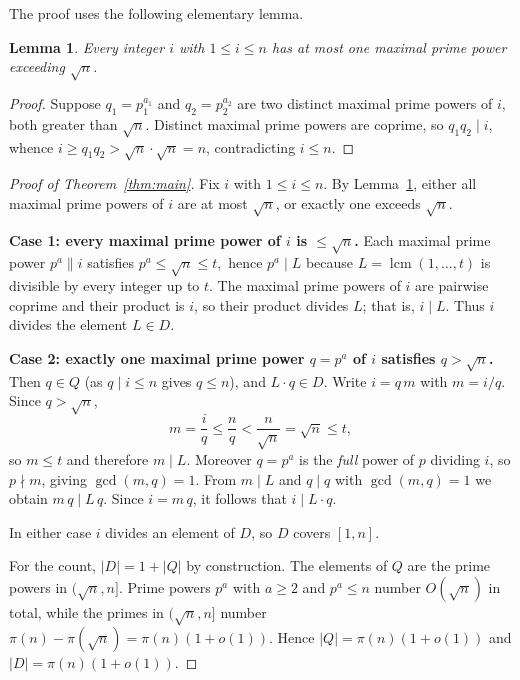 \documentclass[11pt]{article}
\newtheorem{lemma}{Lemma}
\theoremstyle{definition}
\theoremstyle{remark}
\DeclareMathOperator{\lcm}{lcm}
\begin{document}
The proof uses the following elementary lemma.

\begin{lemma}\label{lem:atmostone}
Every integer $i$ with $1\le i\le n$ has at most one maximal prime power
exceeding $\sqrt n$.
\end{lemma}

\begin{proof}
Suppose $q_1=p_1^{a_1}$ and $q_2=p_2^{a_2}$ are two distinct maximal prime
powers of $i$, both greater than $\sqrt n$. Distinct maximal prime powers are
coprime, so $q_1 q_2\mid i$, whence $i\ge q_1 q_2 > \sqrt n\cdot\sqrt n = n$,
contradicting $i\le n$.
\end{proof}

\begin{proof}[Proof of Theorem~\ref{thm:main}]
Fix $i$ with $1\le i\le n$. By Lemma~\ref{lem:atmostone}, either all maximal
prime powers of $i$ are at most $\sqrt n$, or exactly one exceeds $\sqrt n$.

\medskip
\noindent\textbf{Case 1: every maximal prime power of $i$ is $\le\sqrt n$.}
Each maximal prime power $p^{a}\parallel i$ satisfies $p^{a}\le\sqrt n\le t$,\
hence $p^{a}\mid L$ because $L=\lcm(1,\dots,t)$ is divisible by every integer up
to $t$. The maximal prime powers of $i$ are pairwise coprime and their product
is $i$, so their product divides $L$; that is, $i\mid L$. Thus $i$ divides the
element $L\in D$.

\medskip
\noindent\textbf{Case 2: exactly one maximal prime power $q=p^{a}$ of $i$
satisfies $q>\sqrt n$.}
Then $q\in Q$ (as $q\mid i\le n$ gives $q\le n$), and $L\cdot q\in D$. Write
$i=q\,m$ with $m=i/q$. Since $q>\sqrt n$,
\[
  m=\frac{i}{q}\le\frac{n}{q}<\frac{n}{\sqrt n}=\sqrt n\le t,
\]
so $m\le t$ and therefore $m\mid L$. Moreover $q=p^{a}$ is the \emph{full} power
of $p$ dividing $i$, so $p\nmid m$, giving $\gcd(m,q)=1$. From $m\mid L$ and
$q\mid q$ with $\gcd(m,q)=1$ we obtain $m\,q\mid L\,q$. Since $i=m\,q$, it
follows that $i\mid L\cdot q$.

\medskip
In either case $i$ divides an element of $D$, so $D$ covers $[1,n]$.

For the count, $|D|=1+|Q|$ by construction. The elements of $Q$ are the prime
powers in $(\sqrt n,n]$. Prime powers $p^{a}$ with $a\ge 2$ and $p^a\le n$
number $O(\sqrt n)$ in total, while the primes in $(\sqrt n,n]$ number
$\pi(n)-\pi(\sqrt n)=\pi(n)(1+o(1))$. Hence $|Q|=\pi(n)(1+o(1))$ and
$|D|=\pi(n)(1+o(1))$.
\end{proof}
\end{document}
